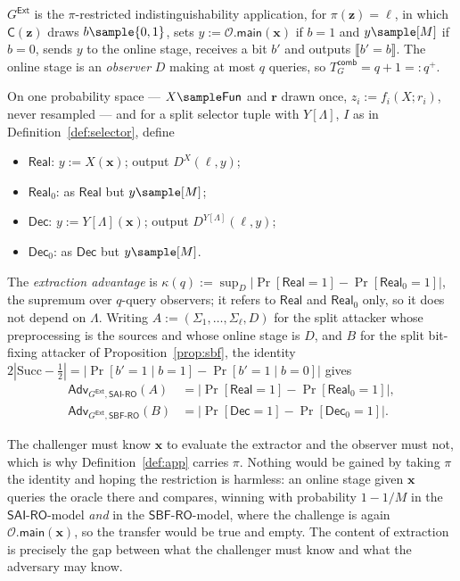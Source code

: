 \documentclass{conjura-conjecture}
\newcommand{\Fun}{\mathsf{Fun}}
\newcommand{\Adv}{\mathsf{Adv}}
\newcommand{\Succ}{\mathrm{Succ}}
\newcommand{\Prob}[1]{\Pr\!\left[#1\right]}
\newcommand{\bits}{\{0,1\}}
\newcommand{\vz}{\mathbf{z}}
\newcommand{\vr}{\mathbf{r}}
\newcommand{\vx}{\mathbf{x}}
\newcommand{\vl}{\boldsymbol{\ell}}
\newcommand{\SAI}{\mathsf{SAI\text{-}RO}}
\newcommand{\SBF}{\mathsf{SBF\text{-}RO}}
\newcommand{\main}{\mathsf{main}}
\newcommand{\Real}{\mathsf{Real}}
\newcommand{\Dec}{\mathsf{Dec}}
\newcommand{\Tcomb}{T^{\mathsf{comb}}_{G}}
\newcommand{\Ext}{\mathsf{Ext}}
\begin{document}
\begin{definition}
\label{def:games}
$G^{\Ext}$ is the $\pi$-restricted indistinguishability application, for
$\pi(\vz) = \vl$, in which $\mathsf{C}(\vz)$ draws $b \sample \bits$, sets
$y := \mathcal{O}.\main(\vx)$ if $b = 1$ and $y \sample [M]$ if $b = 0$,
sends $y$ to the online stage, receives a bit $b'$ and outputs
$\llbracket b' = b\rrbracket$. The online stage is an \emph{observer} $D$
making at most $q$ queries, so $\Tcomb = q+1 =: q^{+}$.

On one probability space --- $X \sample \Fun$ and $\vr$ drawn once,
$z_i := f_i(X;r_i)$, never resampled --- and for a split selector tuple
with $Y[\Lambda]$, $I$ as in Definition~\ref{def:selector}, define
\begin{itemize}
\item $\Real$: $y := X(\vx)$; output $D^{X}(\vl,y)$;
\item $\Real_0$: as $\Real$ but $y \sample [M]$;
\item $\Dec$: $y := Y[\Lambda](\vx)$; output $D^{Y[\Lambda]}(\vl,y)$;
\item $\Dec_0$: as $\Dec$ but $y \sample [M]$.
\end{itemize}
The \emph{extraction advantage} is
$\kappa(q) := \sup_{D} |\Prob{\Real = 1} - \Prob{\Real_0 = 1}|$, the
supremum over $q$-query observers; it refers to $\Real$ and $\Real_0$
only, so it does not depend on $\Lambda$. Writing
$A := (\Sigma_1,\dots,\Sigma_\ell,D)$ for the split attacker whose
preprocessing is the sources and whose online stage is $D$, and $B$ for
the split bit-fixing attacker of Proposition~\ref{prop:sbf}, the identity
$2|\Succ - \tfrac12| = |\Prob{b'{=}1 \mid b{=}1} - \Prob{b'{=}1 \mid
b{=}0}|$ gives
\begin{equation}\label{eq:kappa-is-adv}
\begin{aligned}
  \Adv_{G^{\Ext},\SAI}(A)
  &= \bigl|\Prob{\Real = 1} - \Prob{\Real_0 = 1}\bigr| , \\
  \Adv_{G^{\Ext},\SBF}(B)
  &= \bigl|\Prob{\Dec = 1} - \Prob{\Dec_0 = 1}\bigr| .
\end{aligned}
\end{equation}
\end{definition}

\begin{remark}\label{rem:whypi}
The challenger must know $\vx$ to evaluate the extractor and the observer
must not, which is why Definition~\ref{def:app} carries $\pi$. Nothing
would be gained by taking $\pi$ the identity and hoping the restriction is
harmless: an online stage given $\vx$ queries the oracle there and
compares, winning with probability $1-1/M$ in the $\SAI$-model \emph{and}
in the $\SBF$-model, where the challenge is again
$\mathcal{O}.\main(\vx)$, so the transfer would be true and empty. The
content of extraction is precisely the gap between what the challenger
must know and what the adversary may know.
\end{remark}
\end{document}
